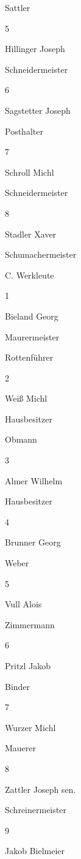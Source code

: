 \documentclass[12pt,a4pager]{book}
\begin{document}
Sattler



5

Hillinger Joseph

Schneidermeister



6

Sagstetter Joseph

Posthalter



7

Schroll Michl

Schneidermeister



8

Stadler Xaver

Schumachermeister





C. Werkleute

1

Bieland Georg

Maurermeister

Rottenführer

2

Weiß Michl

Hausbesitzer

Obmann

3

Almer Wilhelm

Hausbesitzer



4

Brunner Georg

Weber



5

Vull Alois

Zimmermann



6

Pritzl Jakob

Binder



7

Wurzer Michl

Mauerer



8

Zattler Joseph sen.

Schreinermeister



9

Jakob Bielmeier
\end{document}
